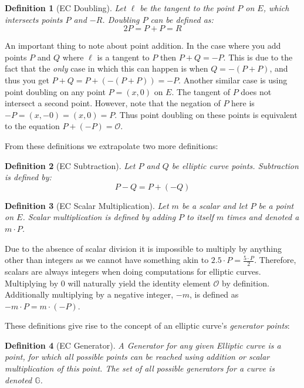\documentclass{article}
\newtheorem{definition}{Definition}[section]
\renewcommand{\O}{\mathcal{O}}
\newcommand{\G}{\mathbb{G}}
\begin{document}
\begin{definition}[EC Doubling]
	Let $\ell$ be the tangent to the point $P$ on $E$, which
	intersects points $P$ and $-R$. Doubling $P$ can be defined as:
	$$2P = P + P = R$$
\end{definition}

An important thing to note about point addition. In the case where
you add points $P$ and $Q$ where $\ell$ is a tangent to $P$ then $P +
Q = -P$. This is due to the fact that the \textit{only} case in which
this can happen is when $Q = -(P + P)$, and thus you get $P + Q = P +
(-(P + P)) = -P$. Another similar case is using point doubling on any
point $P = (x,0)$ on $E$. The tangent of $P$ does not intersect
a second point. However, note that the negation of $P$ here is $-P =
(x,-0) = (x,0) = P$. Thus point doubling on these points is equivalent
to the equation $P + (-P) = \O$.

From these definitions we extrapolate two more definitions:

\begin{definition}[EC Subtraction]
	Let $P$ and $Q$ be elliptic curve points. Subtraction is defined by:
	$$P-Q = P + (-Q)$$
\end{definition}

\begin{definition}[EC Scalar Multiplication]
	Let $m$ be a scalar and let $P$ be a point on $E$. Scalar
	multiplication is defined by adding $P$ to itself $m$ times
	and denoted a $m\cdot P$.
\end{definition}

Due to the absence of scalar division it is impossible to multiply by
anything other than integers as we cannot have something akin to $2.5
\cdot P = \frac{5\cdot P}{2}$. Therefore, scalars are always integers
when doing computations for elliptic curves. Multiplying by $0$ will
naturally yield the identity element $\mathcal{O}$ by definition.
Additionally multiplying by a negative integer, ${-m}$, is defined as
$-m\cdot P = m\cdot ({-P})$. 

\newpage

These definitions give rise to the concept of an elliptic
curve's \textit{generator points}:

\begin{definition}[EC Generator]
	A Generator for any given Elliptic curve is a point, for
	which all possible points can be reached using addition or
	scalar multiplication of this point. The set of all possible
	generators for a curve is denoted $\G$.
\end{definition}
\end{document}
